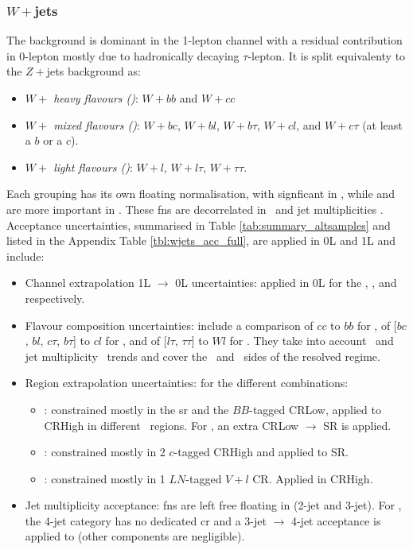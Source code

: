 \subsubsection{$W+$jets} %
The background is dominant in the 1-lepton channel with a residual contribution in 0-lepton mostly due to hadronically decaying $\tau$-lepton. It is split equivalenty to the $Z+$jets background as:   
\begin{itemize}
    \item \textit{$W+$ heavy flavours (\whf)}: $W+bb$ and $W+cc$
    \item \textit{$W+$ mixed flavours (\wmf)}: $W+bc$, $W+bl$, $W+b\tau$, $W+cl$, and $W+c\tau$ (at least a $b$ or a $c$).
    \item \textit{$W+$ light flavours (\wlf)}: $W+l$, $W+l\tau$, $W+\tau\tau$.
\end{itemize}
Each grouping has its own floating normalisation, with \whf signficant in \vhb, while \wmf and \wlf are more important in \vhc. These \gls{fn}s are decorrelated in \ptv\ and jet multiplicities \nj. Acceptance uncertainties, summarised in Table \ref{tab:summary_altsamples} and listed in the Appendix Table \ref{tbl:wjets_acc_full}, are applied in 0L and 1L and include:
\begin{itemize}[leftmargin=*]
    \item Channel extrapolation 1L $\rightarrow$ 0L uncertainties: applied in 0L for the \whf, \wmf, and \wlf respectively. 
    \item Flavour composition uncertainties: include a comparison of $cc$ to $bb$ for \whf, of [$bc$, $bl$, $c\tau$, $b\tau$] to $cl$ for \wmf, and of [$l\tau$, $\tau\tau$] to $Wl$ for \wlf. They take into account \ptv\ and jet multiplicity \nj\ trends and cover the \vhb\ and \vhc\ sides of the resolved regime. 
    \item Region extrapolation uncertainties: for the different combinations:
    \begin{itemize}
        \item \whf: constrained mostly in the \gls{sr} and the $BB$-tagged CRLow, applied to CRHigh in different \ptv\ regions. For \vhb, an extra CRLow $\rightarrow$ SR is applied. 
        \item \wmf: constrained mostly in 2 $c$-tagged CRHigh and applied to SR.
        \item \wlf: constrained mostly in 1 $LN$-tagged $V+l$ CR. Applied in CRHigh. %
    \end{itemize}
    \item Jet multiplicity \nj acceptance: \gls{fn}s are left free floating in \nj (2-jet and 3-jet). For \vhb, the 4-jet category has no dedicated \gls{cr} and a 3-jet $\rightarrow$ 4-jet acceptance is applied to \whf (other components are negligible).
\end{itemize}

